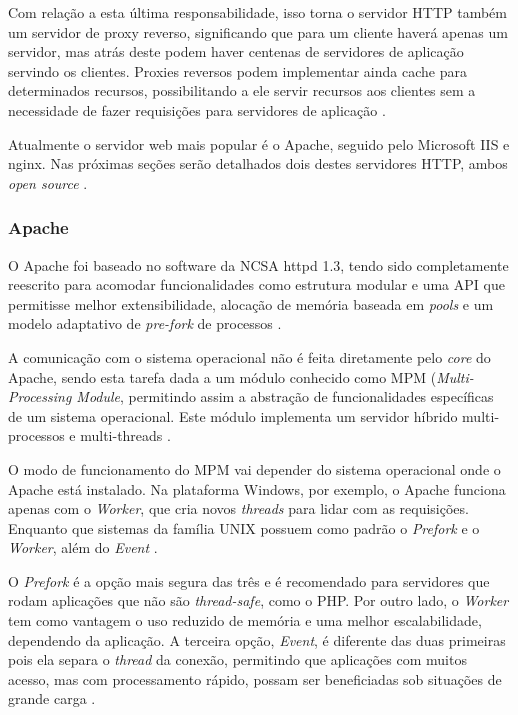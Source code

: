 \documentclass[diss]{template/setrem}
\begin{document}
Com relação a esta última responsabilidade, isso torna o servidor HTTP também um servidor de proxy reverso, significando que para um cliente haverá apenas um servidor, mas atrás deste podem haver centenas de servidores de aplicação servindo os clientes. Proxies reversos podem implementar ainda cache para determinados recursos, possibilitando a ele servir recursos aos clientes sem a necessidade de fazer requisições para servidores de aplicação \citep{Erb2012}.

Atualmente o servidor web mais popular é o Apache, seguido pelo Microsoft IIS e nginx. Nas próximas seções serão detalhados dois destes servidores HTTP, ambos \emph{open source} \citep{Netcraft2012}.

\subsubsection{Apache}
O Apache foi baseado no software da NCSA httpd 1.3, tendo sido completamente reescrito para acomodar funcionalidades como estrutura modular e uma API que permitisse melhor extensibilidade, alocação de memória baseada em \emph{pools} e um modelo adaptativo de \emph{pre-fork} de processos \citep{Apache2012}.

A comunicação com o sistema operacional não é feita diretamente pelo \emph{core} do Apache, sendo esta tarefa dada a um módulo conhecido como MPM (\emph{Multi-Processing Module}, permitindo assim a abstração de funcionalidades específicas de um sistema operacional. Este módulo implementa um servidor híbrido multi-processos e multi-threads \citep{Kew2007, Apache2012a}.

O modo de funcionamento do MPM vai depender do sistema operacional onde o Apache está instalado. Na plataforma Windows, por exemplo, o Apache funciona apenas com o \emph{Worker}, que cria novos \emph{threads} para lidar com as requisições. Enquanto que sistemas da família UNIX possuem como padrão o \emph{Prefork} e o \emph{Worker}, além do \emph{Event} \citep{Kew2007}.

O \emph{Prefork} é a opção mais segura das três e é recomendado para servidores que rodam aplicações que não são \emph{thread-safe}, como o PHP. Por outro lado, o \emph{Worker} tem como vantagem o uso reduzido de memória e uma melhor escalabilidade, dependendo da aplicação. A terceira opção, \emph{Event}, é diferente das duas primeiras pois ela separa o \emph{thread} da conexão, permitindo que aplicações com muitos acesso, mas com processamento rápido, possam ser beneficiadas sob situações de grande carga \citep{Kew2007}.
\end{document}
